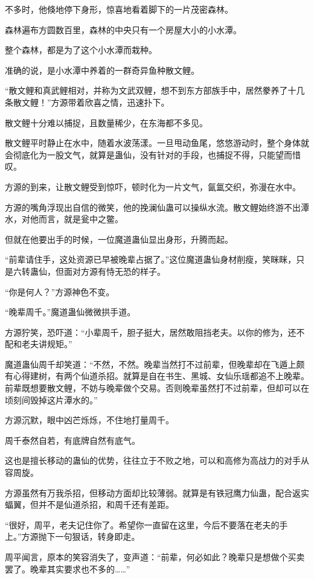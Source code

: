 \begin{this_body}
不多时，他倏地停下身形，惊喜地看着脚下的一片茂密森林。

森林遍布方圆数百里，森林的中央只有一个房屋大小的小水潭。

整个森林，都是为了这个小水潭而栽种。

准确的说，是小水潭中养着的一群奇异鱼种散文鲤。

“散文鲤和真武鲤相对，并称为文武双鲤，想不到东方部族手中，居然豢养了十几条散文鲤！”方源带着欣喜之情，迅速扑下。

散文鲤十分难以捕捉，且数量稀少，在东海都不多见。

散文鲤平时静止在水中，随着水波荡漾。一旦甩动鱼尾，悠悠游动时，整个身体就会彻底化为一股文气，就算是蛊仙，没有针对的手段，也捕捉不得，只能望而惜叹。

方源的到来，让散文鲤受到惊吓，顿时化为一片文气，氤氲交织，弥漫在水中。

方源的嘴角浮现出自信的微笑，他的挽澜仙蛊可以操纵水流。散文鲤始终游不出潭水，对他而言，就是瓮中之鳖。

但就在他要出手的时候，一位魔道蛊仙显出身形，升腾而起。

“前辈请住手，这处资源已早被晚辈占据了。”这位魔道蛊仙身材削瘦，笑眯眯，只是六转蛊仙，但面对方源有恃无恐的样子。

“你是何人？”方源神色不变。

“晚辈周千。”魔道蛊仙微微拱手道。

方源狞笑，恐吓道：“小辈周千，胆子挺大，居然敢阻挡老夫。以你的修为，还不配和老夫讲规矩。”

魔道蛊仙周千却笑道：“不然，不然。晚辈当然打不过前辈，但晚辈却在飞遁上颇有心得建树，有两个仙道杀招。就算是自在书生、黑城、女仙乐瑶都追不上晚辈。前辈既想要散文鲤，不妨与晚辈做个交易。否则晚辈虽然打不过前辈，但却可以在顷刻间毁掉这片潭水的。”

方源沉默，眼中凶芒烁烁，不住地打量周千。

周千泰然自若，有底牌自然有底气。

这也是擅长移动的蛊仙的优势，往往立于不败之地，可以和高修为高战力的对手从容周旋。

方源虽然有万我杀招，但移动方面却比较薄弱。就算是有铁冠鹰力仙蛊，配合返实蝠翼，但并不是仙道杀招，和周千还有差距。

“很好，周平，老夫记住你了。希望你一直留在这里，今后不要落在老夫的手上。”方源抛下一句狠话，转身即走。

周平闻言，原本的笑容消失了，变声道：“前辈，何必如此？晚辈只是想做个买卖罢了。晚辈其实要求也不多的……”


\end{this_body}
